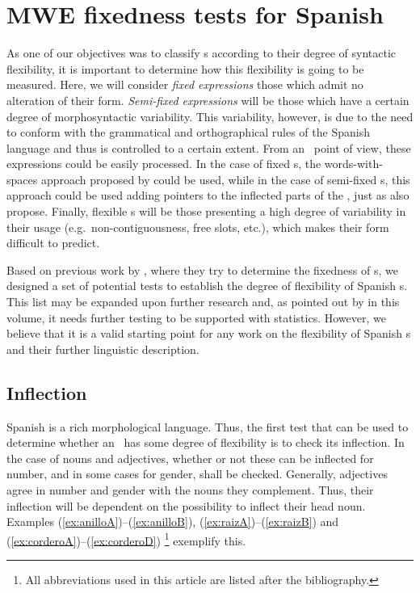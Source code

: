 \documentclass[output=paper]{langsci/langscibook}
\begin{document}
\section{MWE fixedness tests for Spanish}
\label{sec:fixednessTests}

As one of our objectives was to classify \mwe s according to their degree of syntactic flexibility, it is important to determine how this flexibility is going to be measured.
Here, we will consider \textit{fixed expressions} those which admit no alteration of their form.
\textit{Semi-fixed expressions} will be those which have a certain degree of morphosyntactic variability. 
This variability, however, is due to the need to conform with the grammatical and orthographical rules of the Spanish language and thus is controlled to a certain extent.
From an \nlp\ point of view, these expressions could be easily processed.
In the case of fixed \mwe s, the words-with-spaces approach proposed by \citet{Sag:2002} could be used, while in the case of semi-fixed \mwe s, this approach could be used adding pointers to the inflected parts of the \mwe, just as \citet{Sag:2002} also propose.
Finally, flexible \mwe s will be those presenting a high degree of variability in their usage (e.g.\ non-contiguousness, free slots, etc.), which makes their form difficult to predict.

Based on previous work by \citet{Nunberg1994}, where they try to determine the fixedness of \mwe s, we designed a set of potential tests to establish the degree of flexibility of Spanish \mwe s.
This list may be expanded upon further research and, as pointed out by \citet{Laporte:2016} in this volume, it needs further testing to be supported with statistics.
However, we believe that it is a valid starting point for any work on the flexibility of Spanish \mwe s and their further linguistic description.

\subsection{Inflection}
\label{ssec:inflection}

Spanish is a rich morphological language.
Thus, the first test that can be used to determine whether an \mwe\ has some degree of flexibility is to check its inflection.
In the case of nouns and adjectives, whether or not these can be inflected for number, and in some cases for gender, shall be checked.
Generally, adjectives agree in number and gender with the nouns they complement.
Thus, their inflection will be dependent on the possibility to inflect their head noun.
Examples (\ref{ex:anilloA})--(\ref{ex:anilloB}), (\ref{ex:raizA})--(\ref{ex:raizB}) and (\ref{ex:corderoA})--(\ref{ex:corderoD})%
\footnote{All abbreviations used in this article are listed after the bibliography.
} 
exemplify this.
\end{document}
